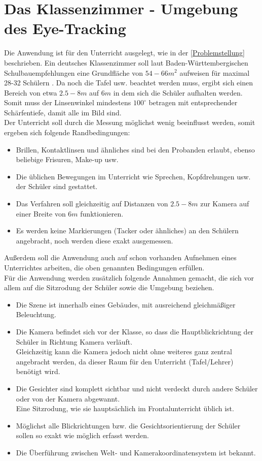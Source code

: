 \section{Das Klassenzimmer - Umgebung des Eye-Tracking}
Die Anwendung ist für den Unterricht ausgelegt, wie in der \autoref{Problemstellung} beschrieben. Ein deutsches Klassenzimmer soll laut Baden-Württembergischen Schulbauempfehlungen eine Grundfläche von $54-66m^2$ aufweisen für maximal 28-32 Schülern \cite{bauordung}. Da noch die Tafel usw. beachtet werden muss, ergibt sich einen Bereich von etwa $2.5 - 8m$ auf $6m$ in dem sich die Schüler aufhalten werden. Somit muss der Linsenwinkel mindestens $100^\circ$ betragen mit entsprechender Schärfentiefe, damit alle im Bild sind.\\
Der Unterricht soll durch die Messung möglichst wenig beeinflusst werden, somit ergeben sich folgende Randbedingungen:
\begin{itemize}
\item Brillen, Kontaktlinsen und ähnliches sind bei den Probanden erlaubt, ebenso beliebige Frisuren, Make-up usw.
\item Die üblichen Bewegungen im Unterricht wie Sprechen, Kopfdrehungen usw. der Schüler sind gestattet.
\item Das Verfahren soll gleichzeitig auf Distanzen von $2.5 - 8m$ zur Kamera auf einer Breite von $6m$ funktionieren.
\item Es werden keine Markierungen (Tacker oder ähnliches) an den Schülern angebracht, noch werden diese exakt ausgemessen.
\end{itemize}
Außerdem soll die Anwendung auch auf schon vorhanden Aufnehmen eines Unterrichtes arbeiten, die oben genannten Bedingungen erfüllen.\\
Für die Anwendung werden zusätzlich folgende Annahmen gemacht, die sich vor allem auf die Sitzrodung der Schüler sowie die Umgebung beziehen.
\begin{itemize}
\item Die Szene ist innerhalb eines Gebäudes, mit ausreichend gleichmäßiger Beleuchtung.
\item Die Kamera befindet sich vor der Klasse, so dass die Hauptblickrichtung der Schüler in Richtung Kamera verläuft.\\
Gleichzeitig kann die Kamera jedoch nicht ohne weiteres ganz zentral angebracht werden, da dieser Raum für den Unterricht (Tafel/Lehrer) benötigt wird.
\item Die Gesichter sind komplett sichtbar und nicht verdeckt durch andere Schüler oder von der Kamera abgewannt.\\
Eine Sitzrodung, wie sie hauptsächlich im Frontalunterricht üblich ist.
\item Möglichst alle Blickrichtungen bzw. die Gesichtsorientierung der Schüler sollen so exakt wie möglich erfasst werden.
\item Die Überführung zwischen Welt- und Kamerakoordinatensystem ist bekannt.
\end{itemize}